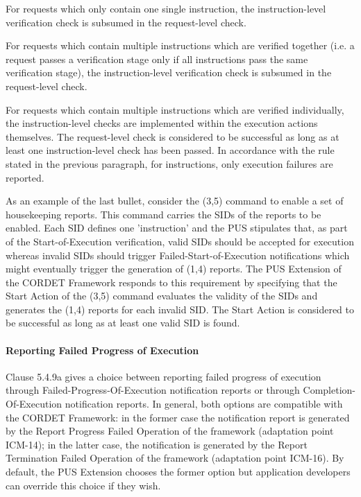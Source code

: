 \documentclass[a4paper,10pt]{article}
\newenvironment{fw_itemize}						%
{\begin{itemize}
  \setlength{\itemsep}{1mm}
  \setlength{\parskip}{0pt}
  \setlength{\parsep}{0pt}}
{\end{itemize}}
\begin{document}
\begin{fw_itemize}
\item For requests which only contain one single instruction, the instruction-level verification check is subsumed in the request-level check.
\item For requests which contain multiple instructions which are verified together (i.e. a request passes a verification stage only if all instructions pass the same verification stage), the instruction-level verification check is subsumed in the request-level check.
\item For requests which contain multiple instructions which are verified individually, the instruction-level checks are implemented within the execution actions themselves. The request-level check is considered to be successful as long as at least one instruction-level check has been passed. In accordance with the rule stated in the previous paragraph, for instructions, only execution failures are reported.
\end{fw_itemize}

As an example of the last bullet, consider the (3,5) command to enable a set of housekeeping reports. This command carries the SIDs of the reports to be enabled. Each SID defines one 'instruction' and the PUS stipulates that, as part of the Start-of-Execution verification, valid SIDs should be accepted for execution whereas invalid SIDs should trigger Failed-Start-of-Execution notifications which might eventually trigger the generation of (1,4) reports. The PUS Extension of the CORDET Framework responds to this requirement by specifying that the Start Action of the (3,5) command evaluates the validity of the SIDs and generates the (1,4) reports for each invalid SID. The Start Action is considered to be successful as long as at least one valid SID is found. 

\paragraph{Reporting Failed Progress of Execution}
Clause 5.4.9a gives a choice between reporting failed progress of execution through Failed-Progress-Of-Execution notification reports or through Completion-Of-Execution notification reports. In general, both options are compatible with the CORDET Framework: in the former case the notification report is generated by the Report Progress Failed Operation of the framework (adaptation point ICM-14); in the latter case, the notification is generated by the Report Termination Failed Operation of the framework (adaptation point ICM-16). By default, the PUS Extension chooses the former option but application developers can override this choice if they wish.
\end{document}

